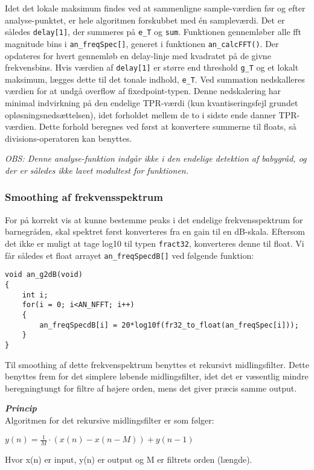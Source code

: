 Idet det lokale maksimum findes ved at sammenligne sample-værdien før og efter analyse-punktet, er hele algoritmen forskubbet med én sampleværdi. Det er således \verb+delay[1]+, der summeres på \verb+e_T+ og \verb+sum+. Funktionen gennemløber alle fft magnitude bins i \verb+an_freqSpec[]+, generet i funktionen \verb+an_calcFFT()+. Der opdateres for hvert gennemløb en delay-linje med kvadratet på de givne frekvensbins. Hvis værdien af \verb+delay[1]+ er større end threshold \verb+g_T+ og et lokalt maksimum, lægges dette til det tonale indhold, \verb+e_T+. Ved summation nedskalleres værdien for at undgå overflow af fixedpoint-typen. Denne nedskalering har minimal indvirkning på den endelige TPR-værdi (kun kvantiseringsfejl grundet opløsningsnedsættelsen), idet forholdet mellem de to i sidste ende danner TPR-værdien. Dette forhold beregnes ved først at konvertere summerne til floats, så divisions-operatoren kan benyttes.

\textit{OBS: Denne analyse-funktion indgår ikke i den endelige detektion af babygråd, og der er således ikke lavet modultest for funktionen.}

\subsubsection{Smoothing af frekvensspektrum}
For på korrekt vis at kunne bestemme peaks i det endelige frekvensspektrum for barnegråden, skal spektret først konverteres fra en gain til en dB-skala. Eftersom det ikke er muligt at tage log10 til typen \verb+fract32+, konverteres denne til float. Vi får således et float arrayet \verb+an_freqSpecdB[]+ ved følgende funktion:
\begin{verbatim}void an_g2dB(void)
{
    int i;
    for(i = 0; i<AN_NFFT; i++)
    {
        an_freqSpecdB[i] = 20*log10f(fr32_to_float(an_freqSpec[i]));
    }
}\end{verbatim}

Til smoothing af dette frekvenspektrum benyttes et rekursivt midlingsfilter. Dette benyttes frem for det simplere løbende midlingsfilter, idet det er væsentlig mindre beregningtungt for filtre af højere orden, mens det giver præcis samme output.

\textbf{\textit{Princip}} \\
Algoritmen for det rekursive midlingsfilter er som følger:
\begin{center}
$y\left( n \right) =\frac { 1 }{ M } \cdot \left( x\left( n \right) -x\left( n-M \right)  \right) +y\left( n-1 \right) $
\end{center}
Hvor x(n) er input, y(n) er output og M er filtrets orden (længde).

